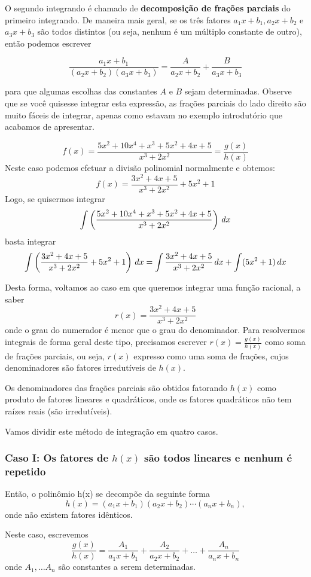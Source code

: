 \cleardoublepage\documentclass[../main.tex]{subfiles}
\begin{document}
O segundo integrando é chamado de \textbf{decomposição de frações parciais} do primeiro integrando. De maneira mais geral, se os três
fatores $a_1 x + b_1, a_2 x + b_2$ e $a_3 x + b_3$ são todos distintos (ou seja, nenhum é um múltiplo constante de
outro), então podemos escrever 
\begin{framed}
\begin{equation*}
    \frac{a_1x+b_1}{(a_2x+b_2)(a_3x+b_3)}=\frac{A}{a_2x+b_2}+\frac{B}{a_3x+b_3}
\end{equation*}
\end{framed}
para que algumas escolhas das constantes $A$ e $B$ sejam determinadas. Observe que se você quisesse integrar esta expressão, as frações parciais do lado direito são muito fáceis de integrar, apenas como estavam no exemplo introdutório que acabamos de apresentar.

$$f(x)=\frac{5x^2+10x^4+x^3+5x^2+4x+5}{x^3+2x^2}=\frac{g(x)}{h(x)}$$
Neste caso podemos efetuar a divisão polinomial normalmente e obtemos:
$$f(x)=\frac{3x^2+4x+5}{x^3+2x^2}+5x^2+1$$
Logo, se quisermos integrar
$$\int \left(\frac{5x^2+10x^4+x^3+5x^2+4x+5}{x^3+2x^2}\right) \, dx$$
basta integrar
$$\int \left(\frac{3x^2+4x+5}{x^3+2x^2}+5x^2+1\right) \, dx=\int \frac{3x^2+4x+5}{x^3+2x^2} \, dx+\int (5x^2+1) \, dx$$

Desta forma, voltamos ao caso em que queremos integrar uma função
racional, a saber
$$r(x)=\frac{3x^2+4x+5}{x^3+2x^2}$$
onde o grau do numerador é menor que o grau do denominador. Para resolvermos integrais de forma geral deste tipo, precisamos escrever $r(x) = \frac{g(x)}{h(x)}$ como soma de frações parciais, ou seja, $r(x)$ expresso como uma soma de frações, cujos denominadores são fatores irredutíveis de $h(x)$.

Os denominadores das frações parciais são obtidos fatorando $h(x)$ como produto de fatores lineares e quadráticos, onde os fatores quadráticos não tem raízes reais (são irredutíveis).

Vamos dividir este método de integração em quatro casos.

\subsubsection*{\hypertarget{FracParcCasoI}{Caso I: Os fatores de $h(x)$ são todos lineares e nenhum é repetido}}
Então, o polinômio h(x) se decompõe da seguinte forma
$$h(x) = (a_1x + b_1)(a_2x + b_2)\cdots (a_nx + b_n),$$
onde não existem fatores idênticos.

Neste caso, escrevemos
\begin{equation}
    \frac{g(x)}{h(x)}=\frac{A_1}{a_1x+b_1}+\frac{A_2}{a_2x+b_2}+\ldots +\frac{A_n}{a_nx+b_n}\label{eq:DecFracParcFatLineares}
\end{equation}
onde $A_1, \ldots A_n$ são constantes a serem determinadas.
\end{document}
